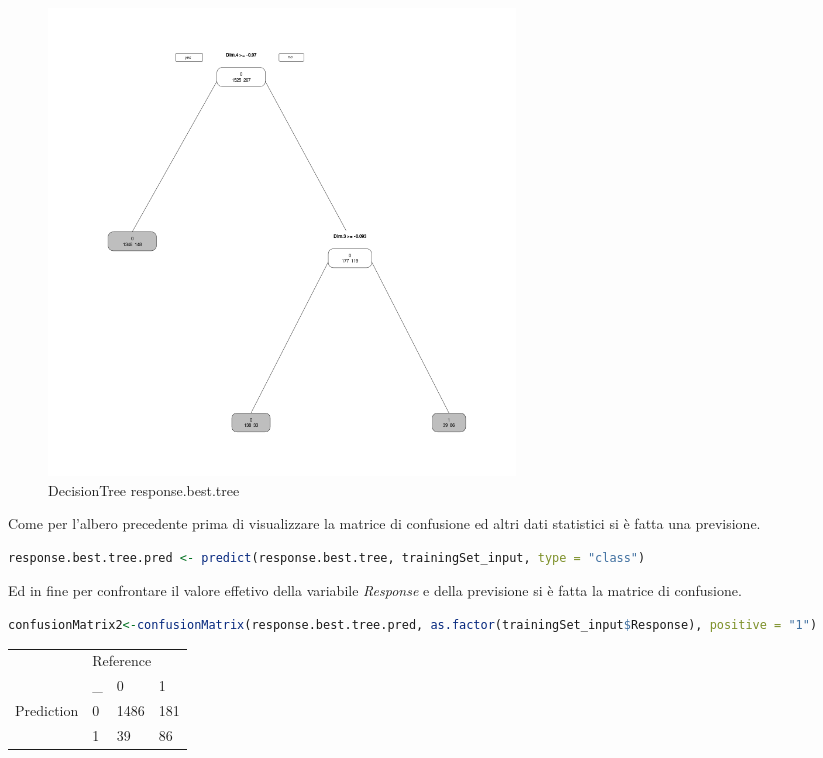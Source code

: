 \documentclass[letterpaper,11pt]{article}
\begin{document}
\begin{figure}[H]
    \centering
    \includegraphics[width=0.6\textwidth]{Img/D-TREE/D-TREE002.png}
    \caption{DecisionTree response.best.tree}
\end{figure}


Come per l'albero precedente prima di visualizzare la matrice di confusione ed altri dati statistici si è fatta una previsione.

\begin{lstlisting}[language=R]
response.best.tree.pred <- predict(response.best.tree, trainingSet_input, type = "class")
\end{lstlisting}

Ed in fine per confrontare il valore effetivo della variabile \textit{Response} e della previsione si è fatta la matrice di confusione. 

\begin{lstlisting}[language=R]
confusionMatrix2<-confusionMatrix(response.best.tree.pred, as.factor(trainingSet_input$Response), positive = "1")
\end{lstlisting}

\begin{table}[h!]
\centering
\begin{tabular}{|ll|lll|}
\hline
\multicolumn{2}{|l|}{\multirow{2}{*}{}} & \multicolumn{3}{l|}{Reference}                        \\ \cline{3-5} 
\multicolumn{2}{|l|}{}                  & \multicolumn{1}{c|}{\_} & \multicolumn{1}{l|}{0}  & 1  \\ \hline
\multicolumn{2}{|l|}{\multirow{2}{*}{Prediction}} & \multicolumn{1}{l|}{0} & \multicolumn{1}{l|}{1486} & 181 \\ \cline{3-5} 
\multicolumn{2}{|l|}{}                  & \multicolumn{1}{l|}{1} & \multicolumn{1}{l|}{39} & 86 \\ \hline
\end{tabular}
\end{table}
\end{document}
